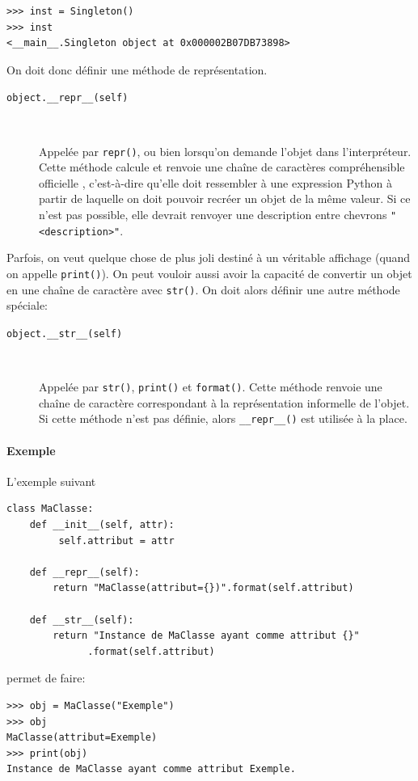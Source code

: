 \documentclass[a4paper, 10pt]{article}
\begin{document}
\begin{verbatim}
>>> inst = Singleton()
>>> inst
<__main__.Singleton object at 0x000002B07DB73898>
\end{verbatim}

On doit donc définir une méthode de représentation.

\begin{description}
    \item[\texttt{object.__repr__(self)}]~

    Appelée par \texttt{repr()}, ou bien lorsqu'on demande l'objet dans l'interpréteur. Cette méthode calcule et renvoie une chaîne de caractères compréhensible \og officielle \fg{}, c'est-à-dire qu'elle doit ressembler à une expression Python à partir de laquelle on doit pouvoir recréer un objet de la même valeur. Si ce n'est pas possible, elle devrait renvoyer une description entre chevrons \texttt{"<description>"}. 
\end{description}

Parfois, on veut quelque chose de plus joli destiné à un véritable affichage (quand on appelle \texttt{print()}). On peut vouloir aussi avoir la capacité de convertir un objet en une chaîne de caractère avec \texttt{str()}. On doit alors définir une autre méthode spéciale:

\begin{description}
    \item[\texttt{object.__str__(self)}]~

    Appelée par \texttt{str()}, \texttt{print()} et \texttt{format()}. Cette méthode renvoie une chaîne de caractère correspondant à la représentation informelle de l'objet. Si cette méthode n'est pas définie, alors \texttt{__repr__()} est utilisée à la place.
\end{description}
\paragraph{Exemple} L'exemple suivant
\begin{verbatim}
class MaClasse:
    def __init__(self, attr):
         self.attribut = attr

    def __repr__(self):
        return "MaClasse(attribut={})".format(self.attribut)

    def __str__(self):
        return "Instance de MaClasse ayant comme attribut {}"
              .format(self.attribut)
\end{verbatim}
permet de faire:
\begin{verbatim}
>>> obj = MaClasse("Exemple")
>>> obj
MaClasse(attribut=Exemple)
>>> print(obj)
Instance de MaClasse ayant comme attribut Exemple.
\end{verbatim}
\end{document}

